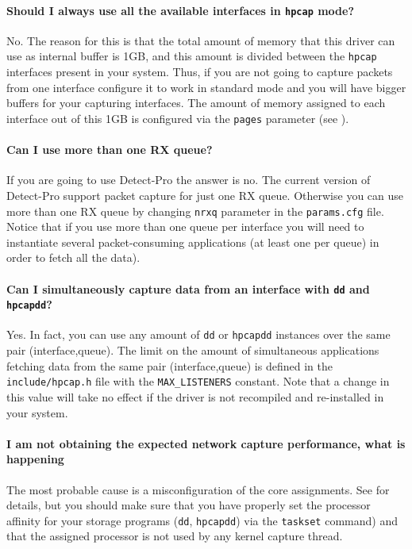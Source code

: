 \documentclass[a4paper,oneside]{hpman}
\begin{document}
\paragraph{Should I always use all the available interfaces in \texttt{hpcap} mode?} \par
    No. The reason for this is that the total amount of memory that this driver can use as internal buffer is 1GB, and this amount is divided between the \texttt{hpcap} interfaces present in your system. Thus, if you are not going to capture packets from one interface configure it to work in standard mode and you will have bigger buffers for your capturing interfaces. The amount of memory assigned to each interface out of this 1GB is configured via the \texttt{pages} parameter (see ).

\paragraph{Can I use more than one RX queue?}
    If you are going to use Detect-Pro the answer is no. The current version of Detect-Pro support packet capture for just one RX queue. Otherwise you can use more than one RX queue by changing \texttt{nrxq} parameter in the \texttt{params.cfg} file. Notice that if you use more than one queue per interface you will need to instantiate several packet-consuming applications (at least one per queue) in order to fetch all the data).

\paragraph{Can I simultaneously capture data from an interface with \texttt{dd} and \texttt{hpcapdd}?}
    Yes. In fact, you can use any amount of \texttt{dd} or \texttt{hpcapdd} instances over the same pair (interface,queue). The limit on the amount of simultaneous applications fetching data from the same pair (interface,queue) is defined in the \texttt{include/hpcap.h} file with the \texttt{MAX\_LISTENERS} constant. Note that a change in this value will take no effect if the driver is not recompiled and re-installed in your system.

\paragraph{I am not obtaining the expected network capture performance, what is happening}
    The most probable cause is a misconfiguration of the core assignments. See  for details, but you should make sure that you have properly set the processor affinity for your storage programs (\texttt{dd}, \texttt{hpcapdd}) via the \texttt{taskset} command) and that the assigned processor is not used by any kernel capture thread.
\end{document}
